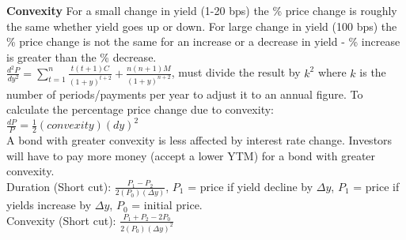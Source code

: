 \documentclass[10pt,landscape]{article}
\begin{document}
\begin{multicols}{3}
{\bf Convexity} For a small change in yield (1-20 bps) the \% price change is roughly the same whether yield goes up or down. For large change in yield (100 bps) the \% price change is not the same for an increase or a decrease in yield - \% increase is greater than the \% decrease.\\
$\frac{d^2P}{dy^2} = \sum_{t=1}^{n} {\frac {t (t+1) C}{{(1+y)}^{t+2}}} + \frac{n(n+1)M}{(1+y)^{n+2}}$, must divide the result by $k^2$ where $k$ is the number of periods/payments per year to adjust it to an annual figure. To calculate the percentage price change due to convexity: $\frac{dP}{P} = \frac{1}{2}(convexity)(dy)^2$\\
A bond with greater convexity is less affected by interest rate change. Investors will have to pay more money (accept a lower YTM) for a bond with greater convexity.\\
Duration (Short cut): $\frac{{P}_{1} - {P}_{2}}{2({P}_{0})(\Delta y)}$, ${P}_{1}$ = price if yield decline by $\Delta y$, ${P}_{1}$ = price if yields increase by $\Delta y$, ${P}_{0}$ = initial price.\\
Convexity (Short cut): $\frac{{P}_{1} + {P}_{2} - 2{P}_{0}}{2({P}_{0})(\Delta y)^2}$ 


\end{multicols}
\end{document}
